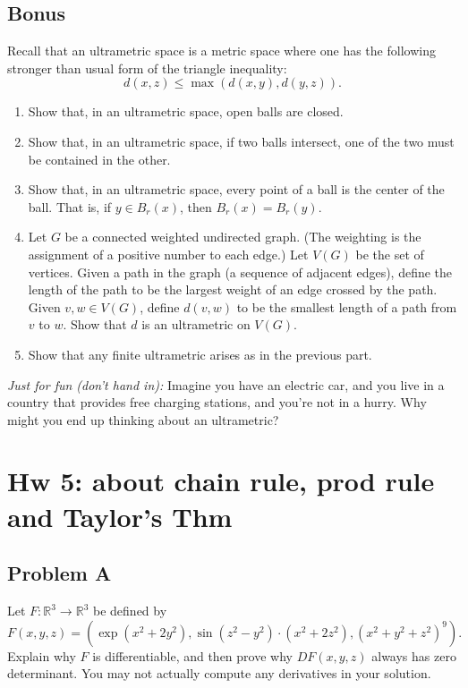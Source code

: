 \documentclass[lang=cn,11pt]{template}
\begin{document}
\section*{Bonus}
Recall that an ultrametric space is a metric space where one has the following stronger than usual form of the triangle inequality:
\[
d(x, z) \leq \max(d(x, y), d(y, z)).
\]
\begin{enumerate}
    \item Show that, in an ultrametric space, open balls are closed.
    \item Show that, in an ultrametric space, if two balls intersect, one of the two must be contained in the other.
    \item Show that, in an ultrametric space, every point of a ball is the center of the ball. That is, if \( y \in B_r(x) \), then \( B_r(x) = B_r(y) \).
    \item Let \( G \) be a connected weighted undirected graph. (The weighting is the assignment of a positive number to each edge.) Let \( V(G) \) be the set of vertices. Given a path in the graph (a sequence of adjacent edges), define the length of the path to be the largest weight of an edge crossed by the path. Given \( v, w \in V(G) \), define \( d(v, w) \) to be the smallest length of a path from \( v \) to \( w \). Show that \( d \) is an ultrametric on \( V(G) \).
    \item Show that any finite ultrametric arises as in the previous part.
\end{enumerate}

\textit{Just for fun (don’t hand in):} Imagine you have an electric car, and you live in a country that provides free charging stations, and you’re not in a hurry. Why might you end up thinking about an ultrametric?



\chapter*{Hw 5: about chain rule, prod rule and Taylor's Thm}

\section*{Problem A}
Let $F : \mathbb{R}^3 \to \mathbb{R}^3$ be defined by
\[
F(x, y, z) = (\exp(x^2 + 2y^2), \sin(z^2 - y^2) \cdot (x^2 + 2z^2), (x^2 + y^2 + z^2)^9).
\]
Explain why $F$ is differentiable, and then prove why $DF(x, y, z)$ always has zero determinant. You may not actually compute any derivatives in your solution.
\end{document}
